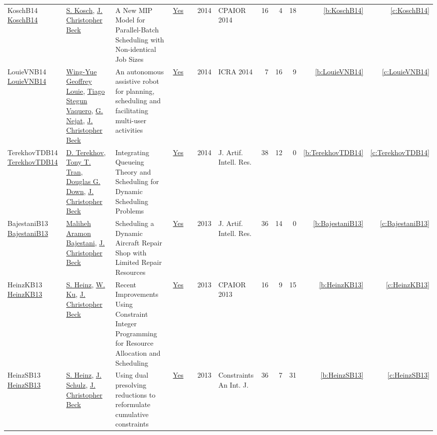 {\begin{longtable}{>{\raggedright\arraybackslash}p{3cm}>{\raggedright\arraybackslash}p{6cm}>{\raggedright\arraybackslash}p{6.5cm}rrrp{2.5cm}rrrrr}
KoschB14 \href{https://doi.org/10.1007/978-3-319-07046-9\_5}{KoschB14} & \hyperref[auth:a333]{S. Kosch}, \hyperref[auth:a89]{J. Christopher Beck} & A New {MIP} Model for Parallel-Batch Scheduling with Non-identical Job Sizes & \href{works/KoschB14.pdf}{Yes} & \cite{KoschB14} & 2014 & CPAIOR 2014 & 16 & 4 & 18 & \ref{b:KoschB14} & \ref{c:KoschB14}\\
LouieVNB14 \href{https://doi.org/10.1109/ICRA.2014.6907637}{LouieVNB14} & \hyperref[auth:a831]{Wing{-}Yue Geoffrey Louie}, \hyperref[auth:a816]{Tiago Stegun Vaquero}, \hyperref[auth:a210]{G. Nejat}, \hyperref[auth:a89]{J. Christopher Beck} & An autonomous assistive robot for planning, scheduling and facilitating multi-user activities & \href{works/LouieVNB14.pdf}{Yes} & \cite{LouieVNB14} & 2014 & ICRA 2014 & 7 & 16 & 9 & \ref{b:LouieVNB14} & \ref{c:LouieVNB14}\\
TerekhovTDB14 \href{https://doi.org/10.1613/jair.4278}{TerekhovTDB14} & \hyperref[auth:a830]{D. Terekhov}, \hyperref[auth:a811]{Tony T. Tran}, \hyperref[auth:a815]{Douglas G. Down}, \hyperref[auth:a89]{J. Christopher Beck} & Integrating Queueing Theory and Scheduling for Dynamic Scheduling Problems & \href{works/TerekhovTDB14.pdf}{Yes} & \cite{TerekhovTDB14} & 2014 & J. Artif. Intell. Res. & 38 & 12 & 0 & \ref{b:TerekhovTDB14} & \ref{c:TerekhovTDB14}\\
BajestaniB13 \href{https://doi.org/10.1613/jair.3902}{BajestaniB13} & \hyperref[auth:a829]{Maliheh Aramon Bajestani}, \hyperref[auth:a89]{J. Christopher Beck} & Scheduling a Dynamic Aircraft Repair Shop with Limited Repair Resources & \href{works/BajestaniB13.pdf}{Yes} & \cite{BajestaniB13} & 2013 & J. Artif. Intell. Res. & 36 & 14 & 0 & \ref{b:BajestaniB13} & \ref{c:BajestaniB13}\\
HeinzKB13 \href{https://doi.org/10.1007/978-3-642-38171-3\_2}{HeinzKB13} & \hyperref[auth:a134]{S. Heinz}, \hyperref[auth:a337]{W. Ku}, \hyperref[auth:a89]{J. Christopher Beck} & Recent Improvements Using Constraint Integer Programming for Resource Allocation and Scheduling & \href{works/HeinzKB13.pdf}{Yes} & \cite{HeinzKB13} & 2013 & CPAIOR 2013 & 16 & 9 & 15 & \ref{b:HeinzKB13} & \ref{c:HeinzKB13}\\
HeinzSB13 \href{https://doi.org/10.1007/s10601-012-9136-9}{HeinzSB13} & \hyperref[auth:a134]{S. Heinz}, \hyperref[auth:a135]{J. Schulz}, \hyperref[auth:a89]{J. Christopher Beck} & Using dual presolving reductions to reformulate cumulative constraints & \href{works/HeinzSB13.pdf}{Yes} & \cite{HeinzSB13} & 2013 & Constraints An Int. J. & 36 & 7 & 31 & \ref{b:HeinzSB13} & \ref{c:HeinzSB13}\\

\end{longtable}}
